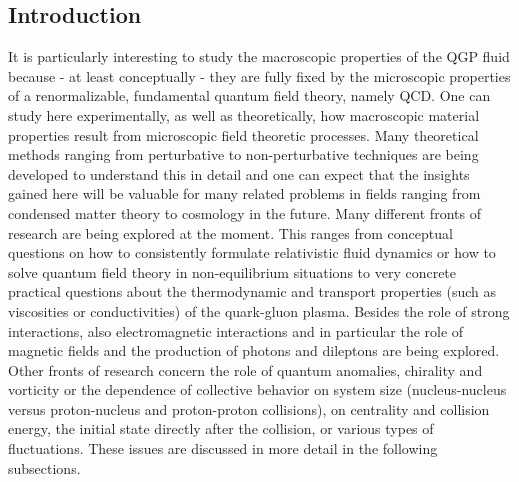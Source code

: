 \subsection{Introduction}

It is particularly interesting to study the macroscopic properties of 
  the QGP fluid because - at least conceptually - they are fully fixed 
  by the microscopic properties of a renormalizable, fundamental quantum 
  field theory, namely QCD. 
One can study here experimentally, as well as theoretically, how 
  macroscopic material properties result from microscopic field 
  theoretic processes. 
Many theoretical methods ranging from perturbative to non-perturbative 
  techniques are being developed to understand this in detail and one can 
  expect that the insights gained here will be valuable for many related 
  problems in fields ranging from condensed matter theory to cosmology in 
  the future.  
Many different fronts of research are being explored at the moment. 
This ranges from conceptual questions on how to consistently formulate 
  relativistic fluid dynamics or how to solve quantum field theory in 
  non-equilibrium situations to very concrete practical questions about 
  the thermodynamic and transport properties (such as viscosities or 
  conductivities) of the quark-gluon plasma. Besides the role of strong 
  interactions, also electromagnetic interactions and in particular the 
  role of magnetic fields and the production of photons and dileptons 
  are being explored. 
Other fronts of research concern the role of quantum anomalies, chirality 
  and vorticity or the dependence of collective behavior on system size 
  (nucleus-nucleus versus proton-nucleus and proton-proton collisions), 
  on centrality and collision energy, the initial state directly after 
  the collision, or various types of fluctuations. 
These issues are discussed in more detail in the following subsections.





